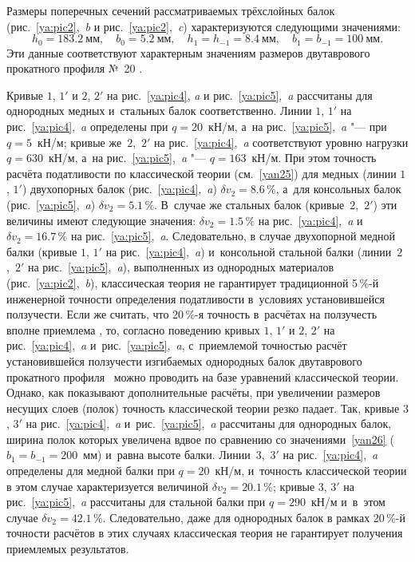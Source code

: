 Размеры поперечных сечений рассматриваемых трёхслойных балок \linebreak (рис.~\ref{ya:pic2},~{\sl b} и рис.~\ref{ya:pic2},~{\sl c}) характеризуются следующими значениями:
\begin{equation}
\label{yan26}
h_0=183.2~\text{мм},\quad b_0=5.2~\text{мм},\quad h_1=h_{-1}=8.4~\text{мм},\quad b_1=b_{-1}=100~\text{мм.}
\end{equation}
Эти данные соответствуют характерным значениям размеров двутаврового прокатного профиля №~20 \cite{yan:bib8}.

Кривые $1$, $1'$ и $2$, $2'$ на рис.~\ref{ya:pic4}, {\sl a} и рис.~\ref{ya:pic5},~{\sl a} рассчитаны для однородных медных и~стальных балок соответственно. 
Линии $1$, $1'$ на рис.~\ref{ya:pic4},~{\sl a} определены при $q=20$~кН/м, 
а~на рис.~\ref{ya:pic5},~{\sl a} "--- при $q=5$~кН/м; 
кривые же~$2$,~$2'$ на рис.~\ref{ya:pic4},~{\sl a} соответствуют уровню нагрузки $q=630$~кН/м, 
а~на рис.~\ref{ya:pic5},~{\sl a} "--- $q=163$~кН/м. 
При этом точность расчёта податливости по классической теории (см.~\eqref{yan25}) для медных (линии $1$, $1'$) двухопорных балок (рис.~\ref{ya:pic4},~{\sl a}) $\delta v_2=8.6\,\%$, 
а~для консольных балок (рис.~\ref{ya:pic5},~{\sl a}) $\delta v_2=5.1\,\%$. 
В~случае же стальных балок (кривые~$2$,~$2'$) эти величины имеют следующие значения: 
$\delta v_2=1.5\,\%$ на рис.~\ref{ya:pic4},~{\sl a} и~$\delta v_2=16.7\,\%$ на рис.~\ref{ya:pic5},~{\sl a}. 
Следовательно, в случае двухопорной медной балки (кривые $1$, $1'$ на рис.~\ref{ya:pic4},~{\sl a}) 
и~консольной стальной балки (линии~$2$,~$2'$ на рис.~\ref{ya:pic5},~{\sl a}), 
выполненных из однородных материалов (рис.~\ref{ya:pic2},~{\sl b}), классическая теория не гарантирует традиционной 5\,\%-й инженерной точности определения податливости в~условиях установившейся ползучести. 
Если же считать, что 20\,\%-я точность в~расчётах на ползучесть вполне приемлема 
\cite{yan:bib4, yan:bib5, yan:bib16}, то, согласно поведению кривых $1$, $1'$ и $2$, $2'$ на рис.~\ref{ya:pic4},~{\sl a} и~рис.~\ref{ya:pic5},~{\sl a}, с~приемлемой точностью расчёт установившейся ползучести изгибаемых однородных балок двутаврового прокатного профиля~\cite{yan:bib8} можно проводить на базе уравнений классической теории. 
Однако, как показывают дополнительные расчёты, при увеличении размеров несущих слоев (полок) точность классической теории резко падает. 
Так, кривые $3$, $3'$ на рис.~\ref{ya:pic4},~{\sl a} и~рис.~\ref{ya:pic5},~{\sl a} рассчитаны для однородных балок, ширина полок которых увеличена вдвое по сравнению со значениями~\eqref{yan26} 
($b_1=b_{-1}=200$~мм) и~равна высоте балки. 
Линии~$3$,~$3'$ на рис.~\ref{ya:pic4},~{\sl a} определены для медной балки при $q=20$~кН/м, 
и~точность классической теории в этом случае характеризуется величиной $\delta v_2=20.1\,\%$; 
кривые $3$, $3'$ на рис.~\ref{ya:pic5},~{\sl a} рассчитаны для стальной балки при $q=290$~кН/м 
и~в~этом случае $\delta v_2=42.1\,\%$. 
Следовательно, даже для однородных балок в рамках 20\,\%-й точности расчётов в этих случаях классическая теория не гарантирует получения приемлемых результатов.



